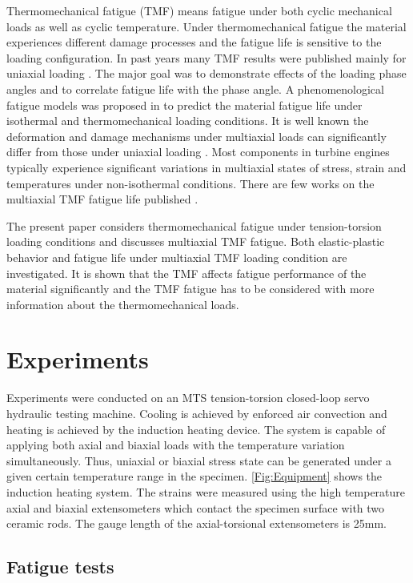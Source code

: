 Thermomechanical fatigue (TMF) means fatigue under both cyclic mechanical loads as well as cyclic temperature. Under thermomechanical fatigue the material experiences different damage processes and the fatigue life is sensitive to the loading configuration. In past years many TMF results were published mainly for uniaxial loading \cite{Evans2008, Kulawinski2015, Remy2003, Bauer2009}. The major goal was to demonstrate effects of the loading phase angles and to correlate fatigue life with the phase angle. A phenomenological fatigue models was proposed  in \cite{Vose2013} to predict the material fatigue life under isothermal and thermomechanical loading conditions. It is well known the deformation and damage mechanisms under multiaxial loads can significantly differ from those under uniaxial loading \cite{Fang2015, Kang2004, Chen2004}. Most components in turbine engines typically experience significant variations in multiaxial states of stress, strain and temperatures under non-isothermal conditions. There are few works on the multiaxial TMF fatigue life published \cite{Brookes2010}.

The present paper considers thermomechanical fatigue under tension-torsion loading conditions and discusses multiaxial TMF fatigue. Both elastic-plastic behavior and fatigue life under multiaxial TMF loading condition are investigated. It is shown that the TMF affects fatigue performance of the material significantly and the TMF fatigue has to be considered with more information about the thermomechanical loads.

\section{Experiments}
\noindent
Experiments were conducted on an MTS tension-torsion closed-loop servo hydraulic testing machine. Cooling is achieved by enforced air convection and heating is achieved by the induction heating device. The system is capable of applying both axial and biaxial loads with the temperature variation simultaneously. Thus, uniaxial or biaxial stress state can be generated under a given certain temperature range in the specimen. \ref{Fig:Equipment} shows the induction heating system. The strains were measured using the high temperature axial and biaxial extensometers which contact the specimen surface with two ceramic rods. The gauge length of the axial-torsional extensometers is 25mm.

\subsection{Fatigue tests}
\noindent


